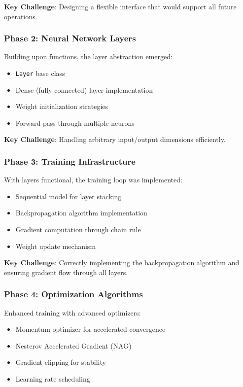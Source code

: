 \documentclass[12pt,a4paper]{article}
\begin{document}
\textbf{Key Challenge}: Designing a flexible interface that would support all future operations.

\subsubsection{Phase 2: Neural Network Layers}

Building upon functions, the layer abstraction emerged:
\begin{itemize}
    \item \texttt{Layer} base class
    \item Dense (fully connected) layer implementation
    \item Weight initialization strategies
    \item Forward pass through multiple neurons
\end{itemize}

\textbf{Key Challenge}: Handling arbitrary input/output dimensions efficiently.

\subsubsection{Phase 3: Training Infrastructure}

With layers functional, the training loop was implemented:
\begin{itemize}
    \item Sequential model for layer stacking
    \item Backpropagation algorithm implementation
    \item Gradient computation through chain rule
    \item Weight update mechanism
\end{itemize}

\textbf{Key Challenge}: Correctly implementing the backpropagation algorithm and ensuring gradient flow through all layers.

\subsubsection{Phase 4: Optimization Algorithms}

Enhanced training with advanced optimizers:
\begin{itemize}
    \item Momentum optimizer for accelerated convergence
    \item Nesterov Accelerated Gradient (NAG)
    \item Gradient clipping for stability
    \item Learning rate scheduling
\end{itemize}
\end{document}
